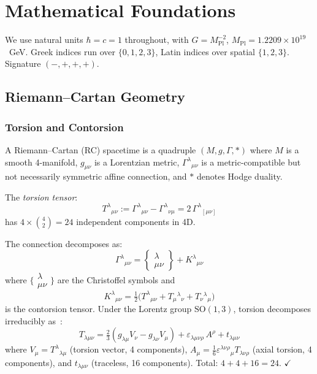 \documentclass[12pt,a4paper]{article}
\newcommand{\MPl}{M_{\mathrm{Pl}}}
\newcommand{\tors}{T^{\lambda}{}_{\mu\nu}}
\newcommand{\contor}{K^{\lambda}{}_{\mu\nu}}
\numberwithin{equation}{section}
\begin{document}
\section{Mathematical Foundations}
\label{sec:math}

We use natural units $\hbar = c = 1$ throughout, with
$G = \MPl^{-2}$, $\MPl = 1.2209\times10^{19}$~GeV.
Greek indices run over $\{0,1,2,3\}$, Latin indices over spatial $\{1,2,3\}$.
Signature $(-,+,+,+)$.

\subsection{Riemann--Cartan Geometry}

\subsubsection{Torsion and Contorsion}

A Riemann--Cartan (RC) spacetime is a quadruple $(M, g, \Gamma, *)$ where
$M$ is a smooth 4-manifold, $g_{\mu\nu}$ is a Lorentzian metric,
$\Gamma^\lambda{}_{\mu\nu}$ is a metric-compatible but not necessarily
symmetric affine connection, and $*$ denotes Hodge duality.

The \emph{torsion tensor}:
\begin{equation}
  \tors := \Gamma^\lambda{}_{\mu\nu} - \Gamma^\lambda{}_{\nu\mu}
  = 2\,\Gamma^\lambda{}_{[\mu\nu]}
  \label{eq:torsion}
\end{equation}
has $4\times\binom{4}{2} = 24$ independent components in 4D.

The connection decomposes as:
\begin{equation}
  \Gamma^\lambda{}_{\mu\nu} = \begin{Bmatrix}\lambda\\\mu\nu\end{Bmatrix}
  + \contor
  \label{eq:connection_decomp}
\end{equation}
where $\bigl\{\begin{smallmatrix}\lambda\\\mu\nu\end{smallmatrix}\bigr\}$
are the Christoffel symbols and
\begin{equation}
  \contor = \tfrac{1}{2}
  \bigl(T^\lambda{}_{\mu\nu} + T_\mu{}^\lambda{}_\nu + T_\nu{}^\lambda{}_\mu\bigr)
  \label{eq:contorsion}
\end{equation}
is the contorsion tensor. Under the Lorentz group $\mathrm{SO}(1,3)$, torsion
decomposes irreducibly as~\citep{Hehl1976}:
\begin{equation}
  T_{\lambda\mu\nu} = \tfrac{2}{3}(g_{\lambda\mu}V_\nu - g_{\lambda\nu}V_\mu)
  + \varepsilon_{\lambda\mu\nu\rho}\,A^\rho + t_{\lambda\mu\nu}
  \label{eq:torsion_decomp}
\end{equation}
where $V_\mu = T^\lambda{}_{\lambda\mu}$ (torsion vector, 4 components),
$A_\mu = \tfrac{1}{6}\varepsilon^{\lambda\nu\rho}{}_\mu T_{\lambda\nu\rho}$
(axial torsion, 4 components), and $t_{\lambda\mu\nu}$ (traceless, 16 components).
Total: $4+4+16 = 24$. $\checkmark$
\end{document}
